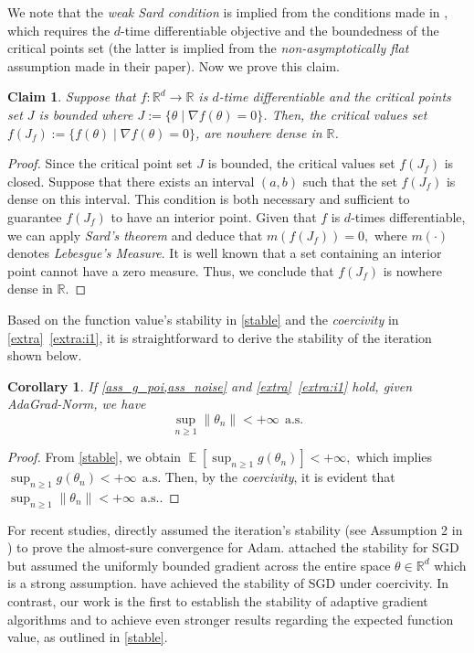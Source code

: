 \documentclass[standalone]{article}
\DeclareMathOperator{\Expect}{\mathbb{E}}
\newtheorem{cor}[thm]{Corollary}
\newtheorem{claims}[remark]{Claim}
\begin{document}
{We note that the \emph{weak Sard condition} is implied from the conditions made in \cite{mertikopoulos2020almost}, which requires the $d$-time differentiable objective and the boundedness of the critical points set (the latter is implied from the \emph{non-asymptotically flat} assumption made in their paper). Now we prove this claim.
\begin{claims}\label{pros:assump:loss}
Suppose that $f:\mathbb{R}^{d}\rightarrow\mathbb{R}$ is  $d$-time differentiable and the critical points set $J$  is bounded where $J:=\{\theta \mid \nabla f(\theta)=0\}$. Then, the critical values set $f(J_{f}):=\{f(\theta) \mid \nabla f(\theta)=0\}$, are nowhere dense in $\mathbb{R}$.
\end{claims}
\begin{proof}
Since the critical point set $J$ is bounded, the critical values set $f(J_{f})$ is closed. Suppose that there exists an interval $(a, b)$ such that the set $f(J_{f})$ is dense on this interval. This condition is both necessary and sufficient to guarantee $f(J_{f})$ to have an interior point. Given that $f$ is  $d$-times differentiable, we can apply \textit{Sard's theorem} \citep{sard1942measure,bates1993toward} and deduce that $m(f(J_{f}))=0,$ where $m(\cdot)$ denotes \textit{Lebesgue's Measure}. It is well known that a set containing an interior point cannot have a zero measure. Thus, we conclude that $f(J_{f})$ is nowhere dense in $\mathbb{R}.$ 
\end{proof}
}
Based on the function value's stability in \cref{stable} and the \emph{coercivity} in \cref{extra}~\ref{extra:i1}, it is straightforward to derive the stability of the iteration shown below.
\begin{cor}\label{stable':iterate}
If \cref{ass_g_poi,ass_noise} and \cref{extra}~\ref{extra:i1} hold, given AdaGrad-Norm, we have
$$\sup_{n\ge 1}\|\theta_{n}\|<+\infty\ \ \text{a.s.}$$
\end{cor}
\begin{proof}
From \cref{stable}, we obtain $\Expect[\sup_{n\ge 1}g(\theta_{n})]<+\infty,$ which implies $\sup_{n\ge 1}g(\theta_{n})<+\infty\ \ \text{a.s.}$ Then, by the \emph{coercivity}, it is evident that $\sup_{n\ge 1}\|\theta_{n}\|<+\infty\ \ \text{a.s.}$. 
\end{proof}
For recent studies, \citep{JMLR:v25:23-0576}  directly assumed the iteration's stability (see Assumption 2 in \cite{JMLR:v25:23-0576}) to prove the almost-sure convergence for Adam. \cite{mertikopoulos2020almost} attached the stability for SGD but assumed the uniformly bounded gradient across the entire space \(\theta \in \mathbb{R}^{d}\) which is a strong assumption. \cite{xiao2023convergence,josz2023lyapunov} have achieved the stability of SGD under coercivity. In contrast, our work is the first to establish the stability of adaptive gradient algorithms and to achieve even stronger results regarding the expected function value, as outlined in \cref{stable}.
\end{document}
